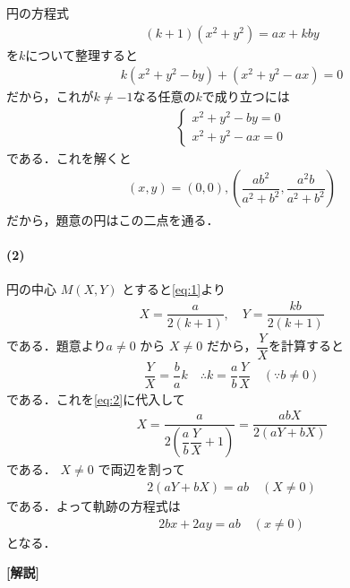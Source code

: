 \documentclass[../../main.tex]{subfiles}
\begin{document}
円の方程式
\begin{align}
  (k+1)(x^2+y^2) = ax + kby \label{eq:1}
\end{align}
を$k$について整理すると
\begin{align}
  k(x^2 + y^2 - by) + (x^2 + y^2 - ax) = 0
\end{align}
だから，これが$k\neq -1$なる任意の$k$で成り立つには
\begin{align}
  \begin{cases}
    x^2 + y^2 - by = 0 \\
    x^2 + y^2 - ax = 0
  \end{cases}
\end{align}
である．これを解くと
\begin{align}
  (x, y) = (0, 0), \left( \dfrac{ab^2}{a^2+b^2}, \dfrac{a^2 b}{a^2+b^2} \right)
\end{align}
だから，題意の円はこの二点を通る．

\paragraph{(2)}

円の中心 $M(X, Y)$ とすると\cref{eq:1}より
\begin{align}
  X = \dfrac{a}{2(k+1)}, \quad Y = \dfrac{kb}{2(k+1)} \label{eq:2}
\end{align}
である．題意より$a \ne 0$ から $X \ne 0$ だから，$\dfrac{Y}{X}$を計算すると
\begin{align}
  \dfrac{Y}{X} = \dfrac{b}{a} k
  \quad \therefore
  k = \dfrac{a}{b} \dfrac{Y}{X} \quad (\because b \ne 0)
\end{align}
である．これを\cref{eq:2}に代入して
\begin{align}
  X = \dfrac{a}{2\left( \dfrac{a}{b} \dfrac{Y}{X} + 1 \right)} = \dfrac{abX}{2(aY + bX)}
\end{align}
である．
$X \ne 0$ で両辺を割って
\begin{align}
  2(aY + bX) = ab \quad (X \ne 0)
\end{align}
である．よって軌跡の方程式は
\begin{align}
  2bx + 2ay = ab \quad (x \ne 0)
\end{align}
となる．

{\bf [解説]}
\end{document}
